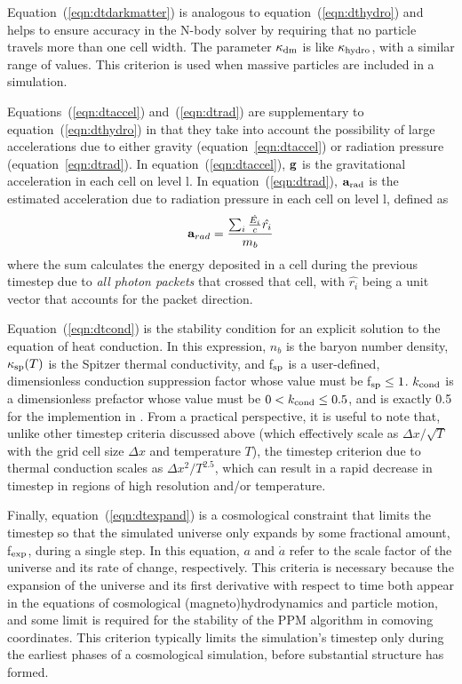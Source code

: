 Equation~(\ref{eqn:dtdarkmatter}) is analogous to
equation~(\ref{eqn:dthydro}) and helps to ensure accuracy in the N-body solver
by requiring that no particle travels more than one cell
width.  The parameter $\kappa_{\rm dm}$ is like $\kappa_{\rm
hydro}$, with a similar range of values.  This criterion is used when
massive particles are included in a simulation.

Equations~(\ref{eqn:dtaccel}) and~(\ref{eqn:dtrad}) are supplementary to equation~(\ref{eqn:dthydro}) in that they
take into account the possibility of large accelerations due to either
gravity (equation~\ref{eqn:dtaccel}) or radiation pressure
(equation~\ref{eqn:dtrad}).  In equation~(\ref{eqn:dtaccel}), $\mathbf{g}$ is the
gravitational acceleration in each cell on level l.  In
equation~(\ref{eqn:dtrad}), $\mathbf{a}_{\rm rad}$ is the estimated
acceleration due to radiation pressure in each cell on level l,
defined as
\begin{equation}
\myvec{a}_{rad} = \frac{ \sum_i \frac{\dot{E_i}}{c} \hat{r_i} }{m_b} 
\end{equation}
where the sum calculates the energy deposited in a cell during the
previous timestep due to \textit{all photon packets} that crossed that
cell, with $\hat{r_i}$ being a unit vector that accounts for the
packet direction.

Equation~(\ref{eqn:dtcond}) is the stability condition for an explicit
solution to the equation of heat conduction.  In this expression,
$n_b$ is the baryon number density, 
$\kappa_{\rm sp}(T)$ is the Spitzer thermal conductivity, and f$_{\rm sp}$ is a
user-defined, dimensionless
conduction suppression factor whose value must be f$_{\rm sp} \leq 1$.  
$k_{\rm cond}$ is a dimensionless prefactor whose
value must be $0 < k_{\rm cond}  \leq 0.5$, and is exactly 0.5 for the
implemention in \enzo.
From a practical
perspective, it is useful to note that, unlike other timestep criteria
discussed above (which effectively scale as $\Delta x / \sqrt{T}$ with
the grid cell size $\Delta x$ and temperature $T$),
the timestep criterion due to thermal conduction scales as $\Delta x^2
/ T^{2.5}$, which can result in a rapid decrease in timestep in
regions of high resolution and/or temperature.

Finally, equation~(\ref{eqn:dtexpand}) is a cosmological constraint that
limits the timestep so that the simulated universe only expands by
some fractional amount, f$_{\rm exp}$, during a single step.  In this
equation, $a$ and $\dot{a}$ refer to the scale factor of the universe
and its rate of change, respectively.  This criteria is necessary
because the expansion of the universe and its first derivative with
respect to time both appear in the equations of cosmological
(magneto)hydrodynamics and particle motion, and some limit is required
for the stability of the PPM algorithm in comoving coordinates.  This
criterion typically limits the simulation's timestep
only during the earliest phases of a cosmological simulation, before
substantial structure has formed.

